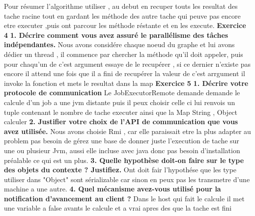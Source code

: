 \documentclass{article}
\begin{document}
Pour résumer l'algorithme utiliser , au debut en recuper touts les resultat des tache racine tout en gardant les méthode 
des autre tache qui peuve pas encore etre executer ,puis ont parcour les méthode réstante et en les execute.
\newline
\newline
\textbf{Exercice 4}
\newline
\textbf{1. Décrire comment vous avez assuré le parallélisme des tâches indépendantes.}
\newline
\newline
    Nous avons considére chaque noeud du graphe et lui avons dédier un thread , il commence par chercher la 
    méthode qu'il doit appeler, puis pour chaqu'un de c'est argument essaye de le recupérer , si ce dernier n'existe pas encore 
    il attend une fois que il a fini de recupérer la valeur de c'est arrgument il invoke la fonction et mets le resultat dans la map
\newline
\newline
\textbf{Exercice 5}
\newline
\textbf{1. Décrire votre protocole de communication}
\newline
Le JobExecutorRemote demande demande le calcule d'un job a une jvm distante puis il peux choisir
celle ci lui renvois un tuple contenant le nombre de tache executer ainsi que la Map String , Object  calculer
\newline
\textbf{2. Justifier votre choix de l’API de communication que vous avez utilisée.}
\newline
Nous avons choisie Rmi , car elle paraissait etre la plus adapter au problem pas besoin de gérez une base de donner 
juste l'execution de tache sur une ou plusieur Jvm, aussi elle incluse avec java donc pas besoin d'installation préalable ce qui est un plus.
\newline
\newline
\textbf{3. Quelle hypothèse doit-on faire sur le type des objets du contexte ? Justifiez.}
\newline
Ont doit fair l'hypothése que les type utiliser dans "Object" sont  sérializable car sinon en peux pas les 
transmetre d'une machine a une autre.
\newline
\newline
\textbf{4. Quel mécanisme avez-vous utilisé pour la notification d’avancement au client ?}
\newline
\newline
Dans le host qui fait le calcule il met une variable a false avants le calcule et a vrai apres des que la tache est fini
\end{document}
